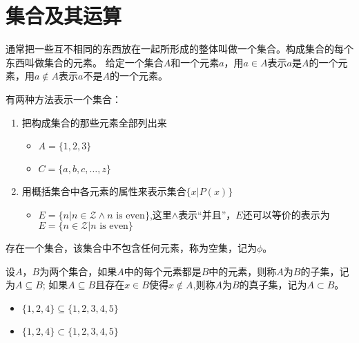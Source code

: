 \chapter{集合及其运算}


  \begin{Def}
    通常把一些互不相同的东西放在一起所形成的整体叫做一个集合。构成集合的每个东西叫做集合的元素。
给定一个集合$A$和一个元素$a$，用$a \in A$表示$a$是$A$的一个元素，用$a \notin A$表示$a$不是$A$的一个元素。
  \end{Def}

  有两种方法表示一个集合：
\begin{enumerate}
\item 把构成集合的那些元素全部列出来
  \begin{itemize}
  \item $A = \{1, 2, 3\}$
\item $C = \{a, b, c, \ldots, z\}$
  \end{itemize}
\item 用概括集合中各元素的属性来表示集合$\{x|P(x)\}$
\begin{itemize}
\item $E = \{n|n \in \mathcal{Z} \land n\text{ is even}\}$,这里$\land$表示“并且”，$E$还可以等价的表示为$E = \{n \in \mathcal{Z} | n\text{ is even}\}$
\end{itemize}
\end{enumerate}

存在一个集合，该集合中不包含任何元素，称为空集，记为$\phi$。

  
\begin{Def}
设$A$，$B$为两个集合，如果$A$中的每个元素都是$B$中的元素，则称$A$为$B$的子集，记为$A \subseteq B$; 如果$A \subseteq B$且存在$x\in B$使得$x \notin A$,则称$A$为$B$的真子集，记为$A\subset B$。    
\end{Def}
\begin{itemize}
  \item   $\{1,2,4\} \subseteq \{1,2,3,4,5\}$
\item $\{1,2,4\} \subset \{1,2,3,4,5\}$
  \end{itemize}

